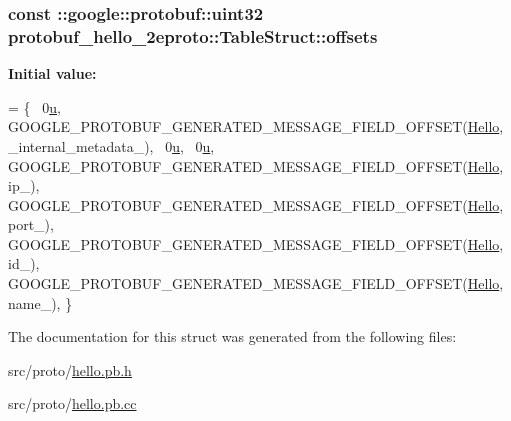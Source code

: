 \subsubsection[{\texorpdfstring{offsets}{offsets}}]{\setlength{\rightskip}{0pt plus 5cm}const \+::google\+::protobuf\+::uint32 protobuf\+\_\+hello\+\_\+2eproto\+::\+Table\+Struct\+::offsets\hspace{0.3cm}{\ttfamily [static]}}\hypertarget{structprotobuf__hello__2eproto_1_1_table_struct_a840ebe7a0940d86cc4e6a328476460ec}{}\label{structprotobuf__hello__2eproto_1_1_table_struct_a840ebe7a0940d86cc4e6a328476460ec}
{\bfseries Initial value\+:}
\begin{DoxyCode}
= \{
  ~0\hyperlink{pem_8h_aae315ef0aa014d60426f50686217d264}{u},  
  GOOGLE\_PROTOBUF\_GENERATED\_MESSAGE\_FIELD\_OFFSET(\hyperlink{class_hello}{Hello}, \_internal\_metadata\_),
  ~0\hyperlink{pem_8h_aae315ef0aa014d60426f50686217d264}{u},  
  ~0\hyperlink{pem_8h_aae315ef0aa014d60426f50686217d264}{u},  
  GOOGLE\_PROTOBUF\_GENERATED\_MESSAGE\_FIELD\_OFFSET(\hyperlink{class_hello}{Hello}, ip\_),
  GOOGLE\_PROTOBUF\_GENERATED\_MESSAGE\_FIELD\_OFFSET(\hyperlink{class_hello}{Hello}, port\_),
  GOOGLE\_PROTOBUF\_GENERATED\_MESSAGE\_FIELD\_OFFSET(\hyperlink{class_hello}{Hello}, id\_),
  GOOGLE\_PROTOBUF\_GENERATED\_MESSAGE\_FIELD\_OFFSET(\hyperlink{class_hello}{Hello}, name\_),
\}
\end{DoxyCode}


The documentation for this struct was generated from the following files\+:\begin{DoxyCompactItemize}
\item 
src/proto/\hyperlink{hello_8pb_8h}{hello.\+pb.\+h}\item 
src/proto/\hyperlink{hello_8pb_8cc}{hello.\+pb.\+cc}\end{DoxyCompactItemize}
